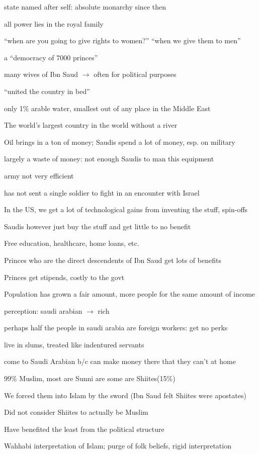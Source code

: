 \documentclass[12pt]{article}
\begin{document}
state named after self: absolute monarchy since then

all power lies in the royal family

``when are you going to give rights to women?'' ``when we give them to men''

a ``democracy of 7000 princes''

many wives of Ibn Saud $\to$ often for political purposes

``united the country in bed''

only 1\% arable water, smallest out of any place in the Middle East

The world's largest country in the world without a river

Oil brings in a ton of money; Saudis spend a lot of money, esp. on military

largely a waste of money: not enough Saudis to man this equipment

army not very efficient

has not sent a single soldier to fight in an encounter with Israel

In the US, we get a lot of technological gains from inventing the stuff, spin-offs

Saudis however just buy the stuff and get little to no benefit

Free education, healthcare, home loans, etc.

Princes who are the direct descendents of Ibn Saud get lots of benefits

Princes get stipends, costly to the govt

Population has grown a fair amount, more people for the same amount of income

perception: saudi arabian $\to$ rich

perhaps half the people in saudi arabia are foreign workers: get no perks

live in slums, treated like indentured servants

come to Saudi Arabian b/c can make money there that they can't at home

99\% Muslim, most are Sunni are some are Shiites(15\%)

We forced them into Islam by the sword (Ibn Saud felt Shiites were apostates)

Did not consider Shiites to actually be Muslim

Have benefited the least from the political structure

Wahhabi interpretation of Islam; purge of folk beliefs, rigid interpretation
\end{document}
